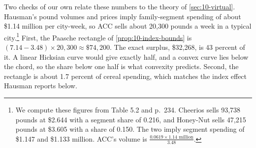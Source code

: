 Two checks of our own relate these numbers to the theory of \cref{sec:10-virtual}. Hausman's pound volumes
and prices imply family-segment spending of about \$1.14 million per city-week, so ACC sells about 20,300
pounds a week in a typical city.\footnote{We compute these figures from Table 5.2 and p.~234. Cheerios sells 93,738
pounds at \$2.644 with a segment share of 0.216, and Honey-Nut sells 47,215 pounds at \$3.605 with a share of
0.150. The two imply segment spending of \$1.147 and \$1.133 million. ACC's volume is
$\frac{0.0619 \times 1.14\text{ million}}{3.48}$.} First, the Paasche rectangle of
\cref{prop:10-index-bounds} is $(7.14 - 3.48)\times 20{,}300 \approx \$74{,}200$. The exact surplus,
\$32,268, is 43 percent of it. A linear Hicksian curve would give exactly half, and a convex curve lies below
the chord, so the share below one half is what convexity predicts. Second, the rectangle is about 1.7 percent
of cereal spending, which matches the index effect Hausman reports below.

